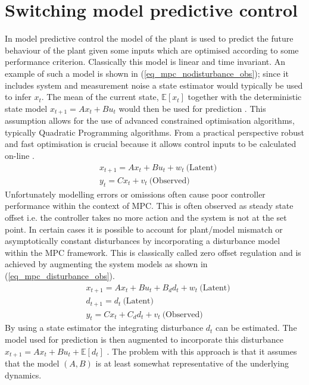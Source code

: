 \section{Switching model predictive control}
\label{sec_switch_mpc_lit}
In model predictive control the model of the plant is used to predict the future behaviour of the plant given some inputs which are optimised according to some performance criterion. Classically this model is linear and time invariant. An example of such a model is shown in (\ref{eq_mpc_nodisturbance_obs}); since it includes system and measurement noise a state estimator would typically be used to infer $x_t$. The mean of the current state, $\mathbb{E}[x_t]$ together with the deterministic state model $x_{t+1} = Ax_t + Bu_t$ would then be used for prediction \cite{raw}. This assumption allows for the use of advanced constrained optimisation algorithms, typically Quadratic Programming algorithms. From a practical perspective robust and fast optimisation is crucial because it allows control inputs to be calculated on-line \cite{mac}.
\begin{equation}
\begin{aligned}
&x_{t+1} = Ax_t + Bu_t + w_t~\text{(Latent)} \\
&y_t = Cx_t + v_t~\text{(Observed)}
\end{aligned}
\label{eq_mpc_nodisturbance_obs}
\end{equation}
Unfortunately modelling errors or omissions often cause poor controller performance within the context of MPC. This is often observed as steady state offset i.e. the controller takes no more action and the system is not at the set point. In certain cases it is possible to account for plant/model mismatch or asymptotically constant disturbances by incorporating a disturbance model within the MPC framework. This is classically called zero offset regulation \cite{raw} and is achieved by augmenting the system models as shown in (\ref{eq_mpc_disturbance_obs}).
\begin{equation}
\begin{aligned}
&x_{t+1} = Ax_t + Bu_t + B_d d_t + w_t~\text{(Latent)} \\
&d_{t+1} = d_t ~\text{(Latent)}\\
&y_t = Cx_t + C_d d_t + v_t~\text{(Observed)}
\end{aligned}
\label{eq_mpc_disturbance_obs}
\end{equation}
By using a state estimator the integrating disturbance $d_t$ can be estimated. The model used for prediction is then augmented to incorporate this disturbance $x_{t+1} = Ax_t + Bu_t + \mathbb{E}[d_t]$ \cite{lee}. The problem with this approach is that it assumes that the model $(A, B)$ is at least somewhat representative of the underlying dynamics.

